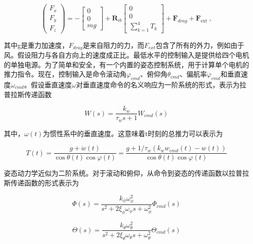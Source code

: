 \begin{equation}
\left(\begin{array}{l}
F_{x} \\
F_{y} \\
F_{z}
\end{array}\right)=-\left[\begin{array}{c}
0 \\
0 \\
m g
\end{array}\right]+\boldsymbol{R}_{i b}\left[\begin{array}{c}
0 \\
0 \\
\sum_{k=1}^{4} T_{k}
\end{array}\right]+\boldsymbol{F}_{d r a g}+\boldsymbol{F}_{\text {ext }},
\end{equation}

其中g是重力加速度，$F_{drag}$是来自阻力的力，而$F_{ext}$包含了所有的外力，例如由于风。假设阻力与各自方向上的速度成正比。最低水平的控制输入是提供给四个电机的单独电源。为了简单和安全，有一个内置的姿态控制系统，用于计算单个电机的推力指令。现在，控制输入是命令滚动角$\varphi_{cmd}$、俯仰角$\theta_{cmd}$、偏航率$\dot{\varphi}_{cmd}$和垂直速度$\omega_{cmd}$。假设垂直速度$\omega$对垂直速度命令的名义响应为一阶系统的形式，表示为拉普拉斯传递函数

\begin{equation}
W(s)=\frac{k_{w}}{\tau_{w} s+1} W_{c m d}(s)
\end{equation}

其中，$\omega(t)$为惯性系中的垂直速度。这意味着t时刻的总推力可以表示为

\begin{equation}
T(t)=\frac{g+\dot{w}(t)}{\cos \theta(t) \cos \varphi(t)}=\frac{g+1 / \tau_{w}\left(k_{w} w_{c m d}(t)-w(t)\right)}{\cos \theta(t) \cos \varphi(t)}
\end{equation}

姿态动力学近似为二阶系统。对于滚动和俯仰，从命令到姿态的传递函数以拉普拉斯传递函数的形式表示为

\begin{equation}
\Phi(s)=\frac{k_{\phi} \omega_{\phi}^{2}}{s^{2}+2 \xi_{\phi} \omega_{\phi} s+\omega_{\phi}^{2}} \Phi_{c m d}(s)
\end{equation}

\begin{equation}
\Theta(s)=\frac{k_{\theta} \omega_{\theta}^{2}}{s^{2}+2 \xi_{\theta} \omega_{\theta} s+\omega_{\theta}^{2}} \Theta_{c m d}(s)
\end{equation}

